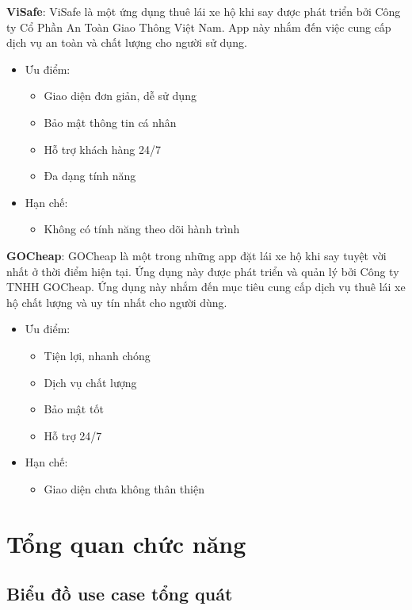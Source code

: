 \documentclass[../DoAn.tex]{subfiles}
\begin{document}
\textbf{ViSafe}: ViSafe là một ứng dụng thuê lái xe hộ khi say được phát triển bởi Công ty Cổ Phần An Toàn Giao Thông Việt Nam. App này nhắm đến việc cung cấp dịch vụ an toàn và chất lượng cho người sử dụng.
\begin{itemize}
    \item Ưu điểm:
      \begin{itemize}
        \item Giao diện đơn giản, dễ sử dụng
        \item Bảo mật thông tin cá nhân
        \item Hỗ trợ khách hàng 24/7
        \item Đa dạng tính năng
      \end{itemize}
    \item Hạn chế:
      \begin{itemize}
        \item Không có tính năng theo dõi hành trình
      \end{itemize}
\end{itemize}

\textbf{GOCheap}: GOCheap là một trong những app đặt lái xe hộ khi say tuyệt vời nhất ở thời điểm hiện tại. Ứng dụng này được phát triển và quản lý bởi Công ty TNHH GOCheap. Ứng dụng này nhắm đến mục tiêu cung cấp dịch vụ thuê lái xe hộ chất lượng và uy tín nhất cho người dùng.
\begin{itemize}
    \item Ưu điểm:
      \begin{itemize}
        \item Tiện lợi, nhanh chóng
        \item Dịch vụ chất lượng
        \item Bảo mật tốt
        \item Hỗ trợ 24/7
      \end{itemize}
    \item Hạn chế:
      \begin{itemize}
        \item Giao diện chưa không thân thiện
      \end{itemize}
\end{itemize}


\section{Tổng quan chức năng}
\label{section:2.2}

\subsection{Biểu đồ use case tổng quát}
\label{subsection:2.2.1}
\end{document}
